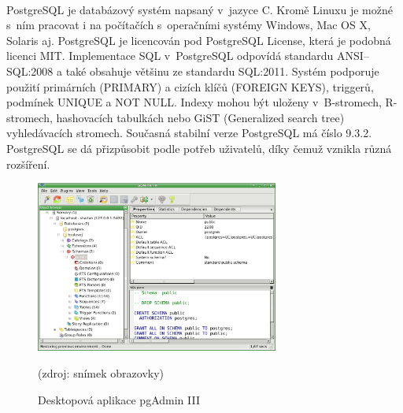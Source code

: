 \documentclass[11pt,a4paper,titlepage,oneside]{book}
\begin{document}
		\paragraph{}PostgreSQL je databázový systém napsaný v~jazyce C. Kromě Linuxu je možné s~ním pracovat i na počítačích s~operačními systémy Windows, Mac OS X, Solaris aj. PostgreSQL je licencován pod PostgreSQL License, která je podobná licenci MIT.  Implementace SQL v~PostgreSQL  odpovídá standardu ANSI--SQL:2008\cite{PostgreSQL} a také obsahuje většinu ze standardu SQL:2011\cite{wiki_postgresql}. Systém podporuje použití primárních (PRIMARY) a cizích klíčů (FOREIGN KEYS), triggerů, podmínek UNIQUE a NOT NULL. Indexy mohou být uloženy v~B-stromech, R-stromech, hashovacích tabulkách nebo GiST (Generalized search tree) vyhledávacích stromech. Současná stabilní verze PostgreSQL má číslo 9.3.2. PostgreSQL se dá přizpůsobit podle potřeb uživatelů, díky čemuž vznikla různá rozšíření. 
		\begin{figure}[!h]
			\begin{center}
				\includegraphics[width=8cm]{obrazky/pgadmin3.png}
				\caption{Desktopová aplikace pgAdmin III}
				\label{fig:pgadmin}
				(zdroj: snímek obrazovky)
			\end{center}
		\end{figure}
\end{document}

